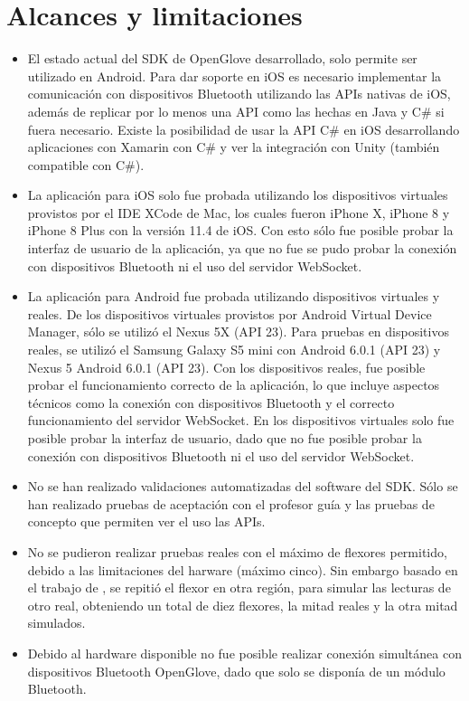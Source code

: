 \section{Alcances y limitaciones}

\begin{itemize}
	
	\item El estado actual del SDK de OpenGlove desarrollado, solo permite ser utilizado en Android. Para dar soporte en iOS es necesario implementar la comunicación con dispositivos Bluetooth utilizando las APIs nativas de iOS, además de replicar por lo menos una API como las hechas en Java y C\# si fuera necesario. Existe la posibilidad de usar la API C\# en iOS desarrollando aplicaciones con Xamarin con C\# y ver la integración con Unity (también compatible con C\#).
	
	\item La aplicación para iOS solo fue probada utilizando los dispositivos virtuales provistos por el IDE XCode de Mac, los cuales fueron iPhone X, iPhone 8 y iPhone 8 Plus  con la versión 11.4 de iOS. Con esto sólo fue posible probar la interfaz de usuario de la aplicación, ya que no fue se pudo probar la conexión con dispositivos Bluetooth ni el uso del servidor WebSocket.
	
	\item La aplicación para Android fue probada utilizando dispositivos virtuales y reales. De los dispositivos virtuales provistos por Android Virtual Device Manager, sólo se utilizó el Nexus 5X (API 23). Para pruebas en dispositivos reales, se utilizó el Samsung Galaxy S5 mini con Android 6.0.1 (API 23) y Nexus 5 Android 6.0.1 (API 23). Con los dispositivos reales, fue posible probar el funcionamiento correcto de la aplicación, lo que incluye aspectos técnicos como la conexión con dispositivos Bluetooth y el correcto funcionamiento del servidor WebSocket. En los dispositivos virtuales solo fue posible probar la interfaz de usuario, dado que no fue posible probar la conexión con dispositivos Bluetooth ni el uso del servidor WebSocket.
	
	\item No se han realizado validaciones automatizadas del software del SDK. Sólo se han realizado pruebas de aceptación con el profesor guía y las pruebas de concepto que permiten ver el uso las APIs.
	
	\item No se pudieron realizar pruebas reales con el máximo de flexores permitido, debido a las limitaciones del harware (máximo cinco). Sin embargo basado en el trabajo de \cite{tesis-cerda-rodrigo}, se repitió el flexor en otra región, para simular las lecturas de otro real, obteniendo un total de diez flexores, la mitad reales y la otra mitad simulados.
	
	\item Debido al hardware disponible no fue posible realizar conexión simultánea con dispositivos Bluetooth OpenGlove, dado que solo se disponía de un módulo Bluetooth.
	
	
\end{itemize}